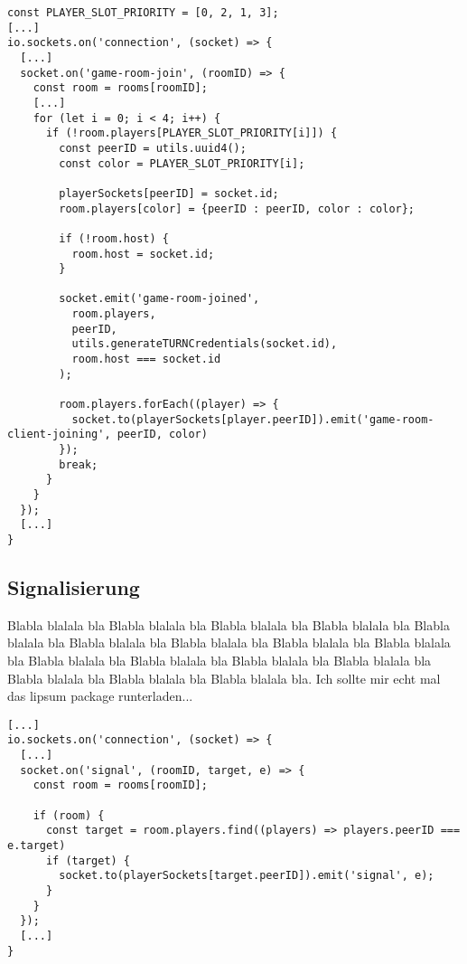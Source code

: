 \vspace{11pt}
\lstset{language=js, style=STYLE_CODE_JS}
\begin{lstlisting}[caption={Event zum Betreten eines Raums -- Server.js}, captionpos=b, label={lst:join}]
const PLAYER_SLOT_PRIORITY = [0, 2, 1, 3];
[...]
io.sockets.on('connection', (socket) => {
  [...]
  socket.on('game-room-join', (roomID) => {
    const room = rooms[roomID];
    [...]
    for (let i = 0; i < 4; i++) {
      if (!room.players[PLAYER_SLOT_PRIORITY[i]]) {
        const peerID = utils.uuid4();
        const color = PLAYER_SLOT_PRIORITY[i];

        playerSockets[peerID] = socket.id;
        room.players[color] = {peerID : peerID, color : color};

        if (!room.host) {
          room.host = socket.id;
        }

        socket.emit('game-room-joined', 
          room.players, 
          peerID, 
          utils.generateTURNCredentials(socket.id), 
          room.host === socket.id
        );

        room.players.forEach((player) => {
          socket.to(playerSockets[player.peerID]).emit('game-room-client-joining', peerID, color)
        });
        break;
      }
    }
  });
  [...]
}
\end{lstlisting}

\subsection{Signalisierung}
Blabla blalala bla Blabla blalala bla Blabla blalala bla Blabla blalala bla Blabla blalala bla Blabla blalala bla Blabla blalala bla Blabla blalala bla Blabla blalala bla Blabla blalala bla Blabla blalala bla Blabla blalala bla Blabla blalala bla Blabla blalala bla Blabla blalala bla Blabla blalala bla. Ich sollte mir echt mal das lipsum package runterladen...

\vspace{11pt}
\lstset{language=js, style=STYLE_CODE_JS}
\begin{lstlisting}[caption={Event zum Weiterleiten eines Signals -- Server.js}, captionpos=b, label={lst:imamakedaroom}]
[...]
io.sockets.on('connection', (socket) => {
  [...]
  socket.on('signal', (roomID, target, e) => {
    const room = rooms[roomID];

    if (room) {
      const target = room.players.find((players) => players.peerID === e.target)
      if (target) {
        socket.to(playerSockets[target.peerID]).emit('signal', e);
      }
    }
  });
  [...]
}
\end{lstlisting}


